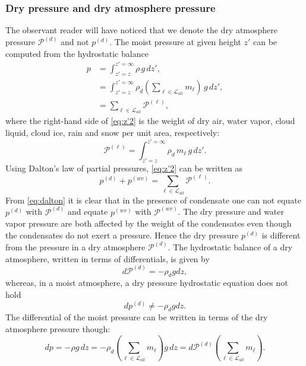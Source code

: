 \documentclass{agujournal}
\begin{document}
\subsubsection{Dry pressure and dry atmosphere pressure}
The observant reader will have noticed that we denote the dry atmosphere pressure $\mathcal{P}^{(d)}$ and not $p^{(d)}$. The moist pressure at given height $z'$ can be computed from the hydrostatic balance
\begin{align}
p&=\int^{z'=\infty}_{z'=z}\rho\, g\, dz',\\
 &=\int^{z'=\infty}_{z'=z}\rho_d \left( \sum_{\ell \in \mathcal{L}_{all}} m_\ell \right)\, g\, dz',\\
 &=\sum_{\ell \in \mathcal{L}_{all}} \mathcal{P}^{(\ell)},\label{eq:z'2}
\end{align}
where the right-hand side of \eqref{eq:z'2} is the weight of dry air, water vapor, cloud liquid, cloud ice, rain and snow per unit area, respectively:
\begin{equation}
{\mathcal{P}}^{(\ell)}=\int^{z'=\infty}_{z'=z}\rho_d \, m_\ell \, g\, dz'\label{eq:z'}.
\end{equation}
Using Dalton's law of partial pressures, \eqref{eq:z'2} can be written as
\begin{equation}
p^{(d)}+p^{(wv)}=\sum_{\ell \in \mathcal{L}_{all}} {\mathcal{P}}^{(\ell)}.\label{eq:dalton}
\end{equation}
From \eqref{eq:dalton} it is clear that in the presence of condensate one can not equate $p^{(d)}$ with ${\mathcal{P}}^{(d)}$ and equate $p^{(wv)}$ with ${\mathcal{P}}^{(wv)}$. The dry pressure and water vapor pressure are both affected by the weight of the condensates even though the condensates do not exert a pressure. Hence the dry pressure $p^{(d)}$ is different from the pressure in a dry atmosphere $\mathcal{P}^{(d)}$. The hydrostatic balance of a dry atmosphere, written in terms of differentials, is given by
\begin{equation}
d\mathcal{P}^{(d)}=-\rho_d g dz,\label{eq:dry_atm_hydro}
\end{equation}
whereas, in a moist atmosphere, a dry pressure hydrostatic equation does not hold
\begin{equation}
dp^{(d)}\ne -\rho_d g dz.
\end{equation}
The differential of the moist pressure can be written in terms of the dry atmosphere pressure though:
\begin{equation}
dp=-\rho g \, dz = -\rho_d \left( \sum_{\ell \in \mathcal{L}_{all}} m_\ell\right)g\, dz = d\mathcal{P}^{(d)}\left( \sum_{\ell \in \mathcal{L}_{all}} m_\ell\right).
\end{equation}
\end{document}
